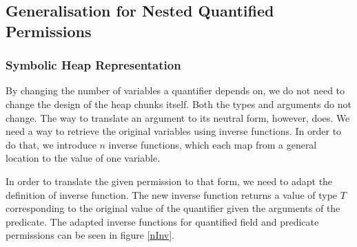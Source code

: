 \documentclass[12pt]{article}
\begin{document}
\subsection{Generalisation for Nested Quantified Permissions}
\label{generalN}




\subsubsection{Symbolic Heap Representation}
By changing the number of variables a quantifier depends on, we do not need to change the design of the heap chunks itself. Both the types and arguments do not change. The way to translate an argument to its neutral form, however, does. We need a way to retrieve the original variables using inverse functions. In order to do that, we introduce \(n\) inverse functions, which each map from a general location to the value of one variable.

In order to translate the given permission to that form, we need to adapt the definition of inverse function. The new inverse function returns a value of type \(T\) corresponding to the original value of the quantifier given the arguments of the predicate. The adapted inverse functions for quantified field and predicate permissions can be seen in figure \ref{nInv}.
\end{document}

